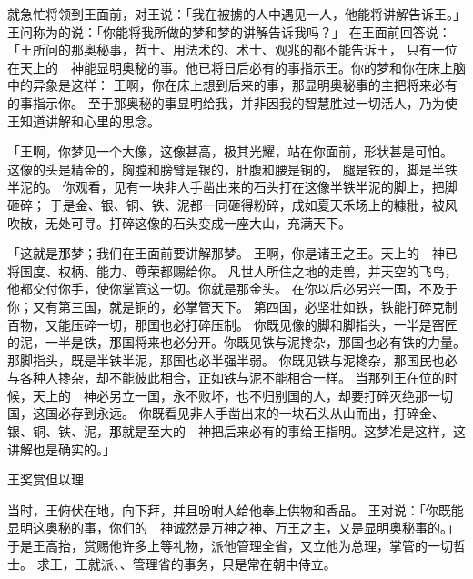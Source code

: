 {\par }{\PP {}就急忙将{}领到王面前，对王说：「我在被掳的{}人中遇见一人，他能将{}讲解告诉王。」
王问称为{}的{}说：「你能将我所做的梦和梦的讲解告诉我吗？」
在王面前回答说：「王所问的那奥秘事，哲士、用法术的、术士、观兆的都不能告诉王，
只有一位在天上的　神能显明奥秘的事。他已将日后必有的事指示{}王。你的梦和你在床上脑中的异象是这样：
王啊，你在床上想到后来的事，那显明奥秘事的主把将来必有的事指示你。
至于那奥秘的事显明给我，并非因我的智慧胜过一切活人，乃为使王知道{}讲解和心里的思念。
\par }{\PP {}「王啊，你梦见一个大像，这像甚高，极其光耀，站在你面前，形状甚是可怕。
这像的头是精金的，胸膛和膀臂是银的，肚腹和腰是铜的，
腿是铁的，脚是半铁半泥的。
你观看，见有一块非人手凿出来的石头打在这像半铁半泥的脚上，把脚砸碎；
于是金、银、铜、铁、泥都一同砸得粉碎，成如夏天禾场上的糠秕，被风吹散，无处可寻。打碎这像的石头变成一座大山，充满天下。
\par }{\PP {}「这就是那梦；我们在王面前要讲解那梦。
王啊，你是诸王之王。天上的　神已将国度、权柄、能力、尊荣都赐给你。
凡世人所住之地的走兽，并天空的飞鸟，他都交付你手，使你掌管这一切。你就是那金头。
在你以后必另兴一国，不及于你；又有第三国，就是铜的，必掌管天下。
第四国，必坚壮如铁，铁能打碎克制百物，又能压碎一切，那国也必打碎压制{}。
你既见像的脚和脚指头，一半是窑匠的泥，一半是铁，那国将来也必分开。你既见铁与泥搀杂，那国也必有铁的力量。
那脚指头，既是半铁半泥，那国也必半强半弱。
你既见铁与泥搀杂，那国民也必与各种人搀杂，却不能彼此相合，正如铁与泥不能相合一样。
当那列王在位的时候，天上的　神必另立一国，永不败坏，也不归别国的人，却要打碎灭绝那一切国，这国必存到永远。
你既看见非人手凿出来的一块石头从山而出，打碎金、银、铜、铁、泥，那就是至大的　神把后来必有的事给王指明。这梦准是这样，这讲解也是确实的。」
\par }{\SH 王奖赏但以理
\par }{\PP {}当时，{}王俯伏在地，向{}下拜，并且吩咐人给他奉上供物和香品。
王对{}说：「你既能显明这奥秘的事，你们的　神诚然是万神之神、万王之主，又是显明奥秘事的。」
于是王高抬{}，赏赐他许多上等礼物，派他管理{}全省，又立他为总理，掌管{}的一切哲士。
求王，王就派{}、{}、{}管理{}省的事务，只是{}常在朝中侍立。

}
